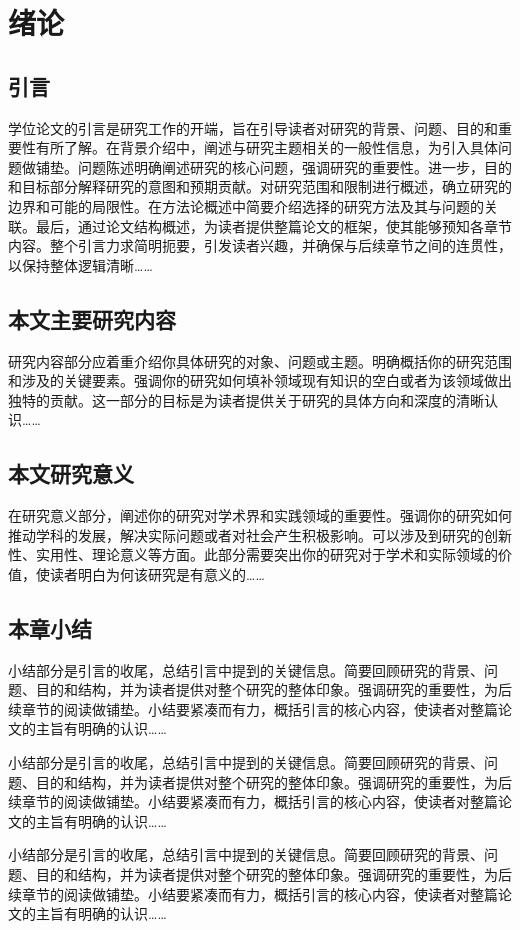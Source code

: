 

\section{绪论}
\subsection{引言}

学位论文的引言是研究工作的开端，旨在引导读者对研究的背景、问题、目的和重要性有所了解。在背景介绍中，阐述与研究主题相关的一般性信息，为引入具体问题做铺垫。问题陈述明确阐述研究的核心问题，强调研究的重要性。进一步，目的和目标部分解释研究的意图和预期贡献。对研究范围和限制进行概述，确立研究的边界和可能的局限性。在方法论概述中简要介绍选择的研究方法及其与问题的关联。最后，通过论文结构概述，为读者提供整篇论文的框架，使其能够预知各章节内容。整个引言力求简明扼要，引发读者兴趣，并确保与后续章节之间的连贯性，以保持整体逻辑清晰……

\subsection{本文主要研究内容}

研究内容部分应着重介绍你具体研究的对象、问题或主题。明确概括你的研究范围和涉及的关键要素。强调你的研究如何填补领域现有知识的空白或者为该领域做出独特的贡献。这一部分的目标是为读者提供关于研究的具体方向和深度的清晰认识……

\subsection{本文研究意义}

在研究意义部分，阐述你的研究对学术界和实践领域的重要性。强调你的研究如何推动学科的发展，解决实际问题或者对社会产生积极影响。可以涉及到研究的创新性、实用性、理论意义等方面。此部分需要突出你的研究对于学术和实际领域的价值，使读者明白为何该研究是有意义的……

\subsection{本章小结}

小结部分是引言的收尾，总结引言中提到的关键信息。简要回顾研究的背景、问题、目的和结构，并为读者提供对整个研究的整体印象。强调研究的重要性，为后续章节的阅读做铺垫。小结要紧凑而有力，概括引言的核心内容，使读者对整篇论文的主旨有明确的认识……

小结部分是引言的收尾，总结引言中提到的关键信息。简要回顾研究的背景、问题、目的和结构，并为读者提供对整个研究的整体印象。强调研究的重要性，为后续章节的阅读做铺垫。小结要紧凑而有力，概括引言的核心内容，使读者对整篇论文的主旨有明确的认识……

小结部分是引言的收尾，总结引言中提到的关键信息。简要回顾研究的背景、问题、目的和结构，并为读者提供对整个研究的整体印象。强调研究的重要性，为后续章节的阅读做铺垫。小结要紧凑而有力，概括引言的核心内容，使读者对整篇论文的主旨有明确的认识……
